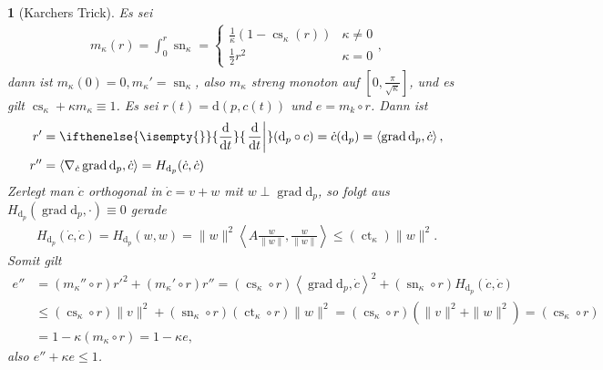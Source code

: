 \documentclass[paper=A4, twoside, chapterprefix=true, bibliography=totoc, headsepline]{scrbook}
\newcommand{\tikzgitter}[3][0.25]{ %
	\draw[step=#1,gray!15] #2 grid #3;
	\draw[step=2*#1,gray!30] #2 grid #3;
	\fill (0,0) circle(0.1); 
}
\DeclareMathOperator{\cs}{cs} %
\DeclareMathOperator{\ct}{ct} %
\DeclareMathOperator{\grad}{grad} %
\DeclareMathOperator{\sn}{sn} %
\newcommand{\dop}{\mathrm{d}}
\newcommand{\difffrac}[3][]{\ifthenelse{\isempty{#1}}{\frac{\dop #2}{\dop #3}}{\left. \frac{\dop #2}{\dop #3} \right|_{#1}}}
\theoremstyle{plain}
\theoremstyle{nonumberplain}
\theoremstyle{empty}
\newtheorem{emptythm}{}%
\theoremstyle{break}
\begin{document}
\begin{emptythm}[Karchers Trick]
  Es sei
  \begin{align*}
    m_{\kappa}(r) = \int_0^r \sn_{\kappa}
    = \begin{cases}
      \frac{1}{\kappa}(1-\cs_{\kappa}(r)) & \kappa \neq 0\\
      \frac{1}{2}r^2 & \kappa = 0
    \end{cases},
  \end{align*}
  dann ist $m_{\kappa}(0) = 0, m_{\kappa}' = \sn_{\kappa}$, also $m_{\kappa}$ streng monoton auf $[0,\frac{\pi}{\sqrt{\kappa}}]$, und es gilt $\cs_{\kappa} + \kappa m_{\kappa} \equiv 1$.
  Es sei $r(t) = \dop(p, c(t))$ und $e = m_k \circ r$.
  Dann ist
  \begin{align*}
    r' & = \difffrac{}{t}(\dop_p \circ c) = \dot c(\dop_p) = \left<\grad \dop_p,\dot c\right>,\\
    r'' & = \left<\nabla_{\dot c} \grad \dop_p,\dot c\right> = H_{\dop_p}(\dot c, \dot c)
  \end{align*}
  Zerlegt man $\dot c$ orthogonal in $\dot c = v + w$ mit $w \perp \grad \dop_p$, so folgt aus $H_{\dop_p}(\grad \dop_p, \cdot) \equiv 0$ gerade
  \begin{align*}
    H_{\dop_p}(\dot c,\dot c) = H_{\dop_p}(w,w)
    = \|w\|^2\left\langle A \frac{w}{\|w\|},\frac{w}{\|w\|}\right\rangle
    \leq (\ct_{\kappa}) \|w\|^2.
  \end{align*}
  Somit gilt
  \begin{align*}
    e'' & = (m_{\kappa}''\circ r)r'^2 + (m_{\kappa}' \circ r) r''
    = (\cs_{\kappa} \circ r) \left<\grad \dop_p,\dot c\right>^2 + (\sn_{\kappa} \circ r)H_{\dop_p}(\dot c, \dot c)\\
    & \leq (\cs_{\kappa} \circ r)\|v\|^2 + (\sn_{\kappa} \circ r)(\ct_{\kappa} \circ r)\|w\|^2
    = (\cs_{\kappa} \circ r)(\|v\|^2 + \|w\|^2)
    = (\cs_{\kappa} \circ r)\\
    & = 1 - \kappa(m_{\kappa} \circ r)
    = 1 - \kappa e,
  \end{align*}
  also $e'' + \kappa e \leq 1$.
  \begin{center}
\end{center}
\end{emptythm}
\end{document}
